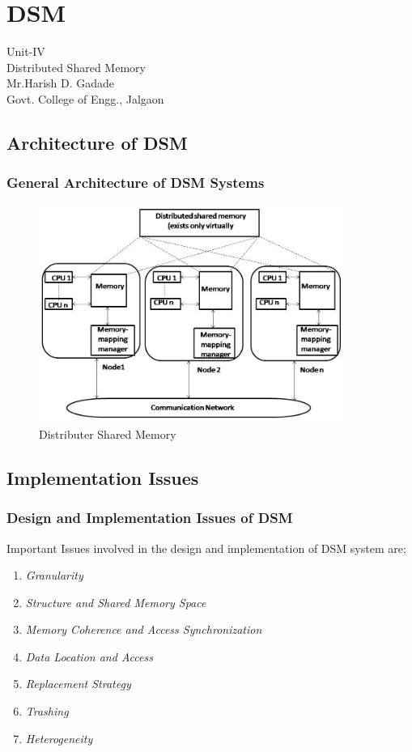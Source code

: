 \documentclass{beamer}
\author[Govt. Colleg of Engg, Jalgaon]{}
\begin{document}
\section{DSM}
\begin{frame}
	\centering
	\large Unit-IV\\
	\huge{Distributed Shared Memory}\\ 
	\vspace{2cm}
	\small{Mr.Harish D. Gadade}\\
	\small{Govt. College of Engg., Jalgaon}
\end{frame}


\subsection{Architecture of DSM}
\begin{frame}
	\frametitle{General Architecture of DSM Systems}
	\begin{figure}
	 	\centering
	 	\includegraphics[width=10cm]{fig51.jpg}
	 	\caption{Distributer Shared Memory}\label{fig51}
	 \end{figure}
\end{frame}


\subsection{Implementation Issues}
\begin{frame}
	\frametitle{Design and Implementation Issues of DSM}
	Important Issues involved in the design and implementation of DSM system are;
	\begin{enumerate}
		\item \textit{Granularity}
		\item \textit{Structure and Shared Memory Space}
		\item \textit{Memory Coherence and Access Synchronization}
		\item \textit{Data Location and Access}
		\item \textit{Replacement Strategy}
		\item \textit{Trashing}
		\item \textit{Heterogeneity}
	\end{enumerate}
	\vspace{2cm}
\end{frame}
\end{document}

